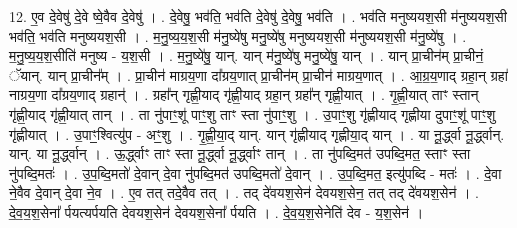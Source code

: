 \documentclass[17pt]{extarticle}
\begin{document}
12. ए॒व दे॒वेषु॑ दे॒वे ष्वे॒वैव दे॒वेषु॑ । . दे॒वेषु॒ भव॑ति॒ भव॑ति दे॒वेषु॑ दे॒वेषु॒ भव॑ति । . भव॑ति मनुष्ययश॒सी म॑नुष्ययश॒सी भव॑ति॒ भव॑ति मनुष्ययश॒सी । . म॒नु॒ष्य॒य॒श॒सी म॑नु॒ष्ये॑षु मनु॒ष्ये॑षु मनुष्ययश॒सी म॑नुष्ययश॒सी म॑नु॒ष्ये॑षु । . म॒नु॒ष्य॒य॒श॒सीति॑ मनुष्य - य॒श॒सी । . म॒नु॒ष्ये॑षु॒ यान्. यान् म॑नु॒ष्ये॑षु मनु॒ष्ये॑षु॒ यान् । . यान् प्रा॒चीन॑म् प्रा॒चीनं॒ ॅयान्. यान् प्रा॒चीन᳚म् । . प्रा॒चीन॑ माग्रय॒णा दा᳚ग्रय॒णात् प्रा॒चीन॑म् प्रा॒चीन॑ माग्रय॒णात् । . आ॒ग्र॒य॒णाद् ग्रहा॒न् ग्रहा॑ नाग्रय॒णा दा᳚ग्रय॒णाद् ग्रहान्॑ । . ग्रहा᳚न् गृह्णी॒याद् गृ॑ह्णी॒याद् ग्रहा॒न् ग्रहा᳚न् गृह्णी॒यात् । . गृ॒ह्णी॒यात् ताꣳ स्तान् गृ॑ह्णी॒याद् गृ॑ह्णी॒यात् तान् । . ता नु॑पाꣳ॒॒शू॑ पाꣳ॒॒शु ताꣳ स्ता नु॑पाꣳ॒॒शु । . उ॒पाꣳ॒॒शु गृ॑ह्णीयाद् गृह्णीया दुपाꣳ॒॒शू॑ पाꣳ॒॒शु गृ॑ह्णीयात् । . उ॒पाꣳ॒॒श्वित्यु॑प - अꣳ॒॒शु । . गृ॒ह्णी॒या॒द् यान्. यान् गृ॑ह्णीयाद् गृह्णीया॒द् यान् । . या नू॒र्द्ध्वा नू॒र्द्ध्वान्. यान्. या नू॒र्द्ध्वान् । . ऊ॒र्द्ध्वाꣳ ताꣳ स्ता नू॒र्द्ध्वा नू॒र्द्ध्वाꣳ तान् । . ता नु॑पब्दि॒मत॑ उपब्दि॒मत॒ स्ताꣳ स्ता नु॑पब्दि॒मतः॑ । . उ॒प॒ब्दि॒मतो॑ दे॒वान् दे॒वा नु॑पब्दि॒मत॑ उपब्दि॒मतो॑ दे॒वान् । . उ॒प॒ब्दि॒मत॒ इत्यु॑पब्दि - मतः॑ । . दे॒वा ने॒वैव दे॒वान् दे॒वा ने॒व । . ए॒व तत् तदे॒वैव तत् । . तद् दे॑वयश॒सेन॑ देवयश॒सेन॒ तत् तद् दे॑वयश॒सेन॑ । . दे॒व॒य॒श॒सेना᳚ र्पयत्यर्पयति देवयश॒सेन॑ देवयश॒सेना᳚ र्पयति । . दे॒व॒य॒श॒सेनेति॑ देव - य॒श॒सेन॑ । \newline
\end{document}
